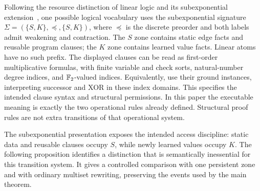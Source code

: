 Following the resource distinction of linear logic and its subexponential
extension~\cite{Girard1987,NigamMiller2009SELL}, one possible logical
vocabulary uses the subexponential signature
$\Sigma=(\{S,K\},\preceq,\{S,K\})$, where $\preceq$ is the discrete
preorder and both labels admit weakening and contraction. The $S$ zone
contains static edge facts and reusable program clauses; the $K$ zone
contains learned value facts. Linear atoms have no such prefix.
The displayed clauses can be read as first-order multiplicative formulas,
with finite variable and check sorts, natural-number degree indices, and
$\mathbb{F}_2$-valued indices. Equivalently, use their ground instances, interpreting
successor and XOR in these index domains. This specifies the intended clause
syntax and structural permissions. In this paper the executable meaning
is exactly the two operational rules already defined. Structural proof rules
are not extra transitions of that operational system.

The subexponential presentation exposes the intended access discipline:
static data and reusable clauses occupy $S$, while newly learned values
occupy $K$. The following proposition identifies a distinction that is
semantically inessential for this transition system. It gives a controlled
comparison with one persistent zone and with ordinary multiset rewriting,
preserving the events used by the main theorem.

